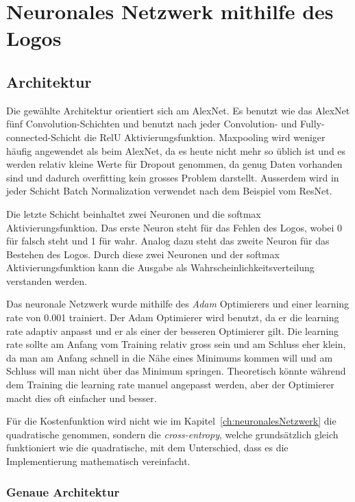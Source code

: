 \documentclass[12pt,a4paper]{report}
\begin{document}
\section{Neuronales Netzwerk mithilfe des Logos}
\subsection{Architektur}
Die gewählte Architektur orientiert sich am AlexNet\cite{alex}.
Es benutzt wie das AlexNet fünf Convolution-Schichten und benutzt nach jeder Convolution- und Fully-connected-Schicht die RelU Aktivierungsfunktion.
Maxpooling wird weniger häufig angewendet als beim AlexNet, da es heute nicht mehr so üblich ist\cite{conv} und
es werden relativ kleine Werte für Dropout genommen, da genug Daten vorhanden sind und dadurch overfitting kein grosses Problem darstellt.
Ausserdem wird in jeder Schicht Batch Normalization verwendet nach dem Beispiel vom ResNet\cite{conv}.

Die letzte Schicht beinhaltet zwei Neuronen und die softmax Aktivierungsfunktion.
Das erste Neuron steht für das Fehlen des Logos, wobei 0 für falsch steht und 1 für wahr.
Analog dazu steht das zweite Neuron für das Bestehen des Logos.
Durch diese zwei Neuronen und der softmax Aktivierungsfunktion kann die Ausgabe als Wahrscheinlichkeitsverteilung verstanden werden.

Das neuronale Netzwerk wurde mithilfe des \textit{Adam} Optimierers\cite{adam} und einer learning rate von 0.001 trainiert.
Der Adam Optimierer wird benutzt, da er die learning rate adaptiv anpasst und er als einer der besseren Optimierer gilt\cite{adam}.
Die learning rate sollte am Anfang vom Training relativ gross sein und am Schluss eher klein, da man am Anfang schnell in die Nähe eines Minimums kommen will
und am Schluss will man nicht über das Minimum springen.
Theoretisch könnte während dem Training die learning rate manuel angepasst werden, aber der Optimierer macht dies oft einfacher und besser.

Für die Kostenfunktion wird nicht wie im Kapitel~\ref{ch:neuronalesNetzwerk} die quadratische genommen,
sondern die \textit{cross-entropy}\cite{softmax}, welche grundsätzlich gleich funktioniert wie die quadratische, mit dem Unterschied,
dass es die Implementierung mathematisch vereinfacht\cite{softmax}.

\subsubsection{Genaue Architektur}
\end{document}
